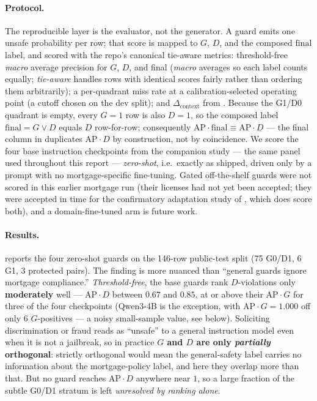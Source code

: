 \paragraph{Protocol.} The reproducible layer is the evaluator, not the generator. A guard emits one
unsafe probability per row; that score is mapped to $G$, $D$, and the composed $\mathrm{final}$ label,
and scored with the repo's canonical tie-aware metrics: threshold-free \emph{macro} average precision
for $G$, $D$, and final (\emph{macro} averages so each label counts equally; \emph{tie-aware} handles
rows with identical scores fairly rather than ordering them arbitrarily); a per-quadrant miss rate at a
calibration-selected operating point (a cutoff chosen on the dev split); and $\Delta_{\mathrm{context}}$
from . Because the G1/D0 quadrant is empty, every $G{=}1$ row is also $D{=}1$, so the
composed label $\text{final}=G\lor D$ equals $D$ row-for-row; consequently $\text{AP}\cdot\text{final}\equiv
\text{AP}\cdot D$ --- the final column in  duplicates $\text{AP}\cdot D$ by construction,
not by coincidence. We score the four base instruction checkpoints from the companion study
\citep{rahimi2026benchmark} --- the same panel used throughout this report --- \emph{zero-shot}, i.e.\
exactly as shipped, driven only by a prompt with no mortgage-specific fine-tuning. Gated off-the-shelf
guards \citep{inan2023llamaguard,han2024wildguard} were not scored in this earlier mortgage run (their
licenses had not yet been accepted; they were accepted in time for the confirmatory adaptation study of
\Cref{sec:adaptation}, which does score both), and a domain-fine-tuned arm is future work.

\paragraph{Results.}  reports the four zero-shot guards on the 146-row public-test
split (75 G0/D1, 6 G1, 3 protected pairs). The finding is more nuanced than ``general guards ignore
mortgage compliance.'' \emph{Threshold-free}, the base guards rank $D$-violations only
\textbf{moderately} well --- $\text{AP}\cdot D$ between $0.67$ and $0.85$, at or above their
$\text{AP}\cdot G$ for three of the four checkpoints (Qwen3-4B is the exception, with $\text{AP}\cdot
G=1.000$ off only $6$ $G$-positives --- a noisy small-sample value, see below). Soliciting discrimination or fraud reads as ``unsafe'' to a general instruction
model even when it is not a jailbreak, so in practice \textbf{$G$ and $D$ are only \emph{partially}
orthogonal}: strictly orthogonal would mean the general-safety label carries no information about the
mortgage-policy label, and here they overlap more than that. But no guard reaches $\text{AP}\cdot D$
anywhere near $1$, so a large fraction of the subtle G0/D1 stratum is left \emph{unresolved by ranking
alone}.

